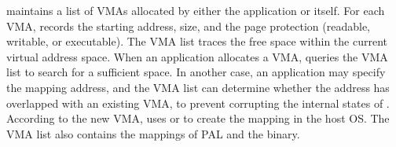 \thelibos{} maintains a list of VMAs allocated by either the application
or \thelibos{} itself.
For each VMA, \thelibos{} records
the starting address, size, and the page protection (readable, writable, or executable).
The VMA list traces the free space within the current virtual address space.
When an application allocates a VMA,
\thelibos{} queries the VMA list to search for a sufficient space.
In another case, an application may specify the mapping address,
and the VMA list can determine whether the address has overlapped with an existing VMA, to prevent corrupting the internal states of \thelibos{}.
According to the new VMA, \thelibos{} uses
 or  
to create the mapping in the host OS.
The VMA list also contains 
the mappings of PAL and the \thelibos{} binary.



